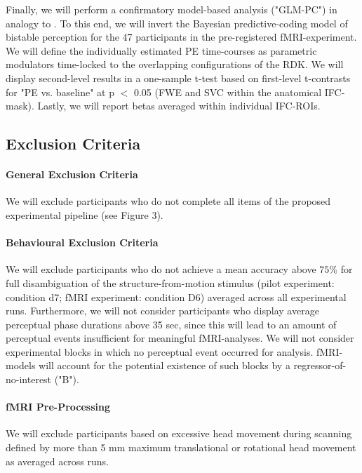 \documentclass[12pt]{article}
\begin{document}
Finally, we will perform a confirmatory model-based analysis ("GLM-PC") in analogy to \cite{Weilnhammer2017}. To this end, we will invert the Bayesian predictive-coding model of bistable perception for the 47 participants in the pre-registered fMRI-experiment. We will define the individually estimated PE time-courses as parametric modulators time-locked to the overlapping configurations of the RDK. We will display second-level results in a one-sample t-test based on first-level t-contrasts for "PE vs. baseline" at p $<$ 0.05 (FWE and SVC within the anatomical IFC-mask). Lastly, we will report betas averaged within individual IFC-ROIs.

\subsection{Exclusion Criteria}

\paragraph{General Exclusion Criteria}

We will exclude participants who do not complete all items of the proposed experimental pipeline (see Figure 3).  

\paragraph{Behavioural Exclusion Criteria}

We will exclude participants who do not achieve a mean accuracy above $75\%$ for full disambiguation of the structure-from-motion stimulus (pilot experiment: condition d7; fMRI experiment: condition D6) averaged across all experimental runs. Furthermore, we will not consider participants who display average perceptual phase durations above 35 sec, since this will lead to an amount of perceptual events insufficient for meaningful fMRI-analyses. We will not consider experimental blocks in which no perceptual event occurred for analysis. fMRI-models will account for the potential existence of such blocks by a regressor-of-no-interest ("B").    

\paragraph{fMRI Pre-Processing} 

We will exclude participants based on excessive head movement during scanning defined by more than 5 mm maximum translational or rotational head movement as averaged across runs.
\end{document}
